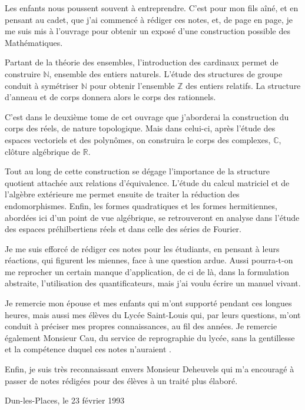 Les enfants nous poussent souvent à entreprendre. C'est pour mon fils aîné, et en pensant au cadet, que j'ai commencé à rédiger ces notes, et, de page en page, je me suis mis à l'ouvrage pour obtenir un exposé d'une construction possible des Mathématiques.

Partant de la théorie des ensembles, l'introduction des cardinaux permet de construire $\mathbb N$, ensemble des entiers naturels. L'étude des structures de groupe conduit à symétriser $\mathbb N$ pour obtenir l'ensemble $\mathbb Z$ des entiers relatifs. La structure d'anneau et de corps donnera alors le corps des rationnels.

C'est dans le deuxième tome de cet ouvrage que j'aborderai la construction du corps des réels, de nature topologique. Mais dans celui-ci, après l'étude des espaces vectoriels et des polynômes, on construira le corps des complexes, $\mathbb C$, clôture algébrique de $\mathbb R$.

Tout au long de cette construction se dégage l'importance de la structure quotient attachée aux relations d'équivalence. L'étude du calcul matriciel et de l'algèbre extérieure me permet ensuite de traiter la réduction des endomorphismes. Enfin, les formes quadratiques et les formes hermitiennes, abordées ici d'un point de vue algébrique, se retrouveront en analyse dans l'étude des espaces préhilbertiens réels et dans celle des séries de Fourier.

Je me suis efforcé de rédiger ces notes pour les étudiants, en pensant à leurs réactions, qui figurent les miennes, face à une question ardue. Aussi pourra-t-on me reprocher un certain manque d'application, de ci de là, dans la formulation abstraite, l'utilisation des quantificateurs, mais j'ai voulu écrire un manuel vivant.

Je remercie mon épouse et mes enfants qui m'ont supporté pendant ces longues heures, mais aussi mes élèves du Lycée Saint-Louis qui, par leurs questions, m'ont conduit à préciser mes propres connaissances, au fil des années. Je remercie également Monsieur Cau, du service de reprographie du lycée, sans la gentillesse et la compétence duquel ces notes n'auraient .

Enfin, je suis très reconnaissant envers Monsieur Deheuvels qui m'a encouragé à passer de notes rédigées pour des élèves à un traité plus élaboré.

\begin{flushright}Dun-les-Places, le 23 février 1993\end{flushright}
\clearpage
